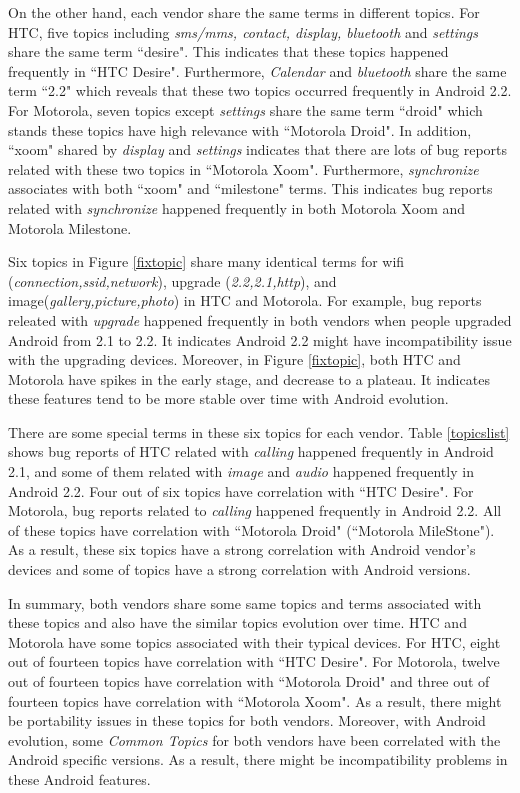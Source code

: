\documentclass[10pt, conference, compsocconf]{IEEEtran}
\begin{document}
On the other hand, each vendor share the same terms in different topics. For HTC, five topics including \textit{sms\//mms, contact, display, bluetooth} and \textit{settings} share the same term ``desire". This indicates that these topics happened frequently in ``HTC Desire". Furthermore, \textit{Calendar} and \textit{bluetooth} share the same term ``2.2" which reveals that these two topics occurred frequently in Android 2.2. For Motorola, seven topics except \textit{settings} share the same term ``droid" which stands these topics have high relevance with ``Motorola Droid". In addition, ``xoom" shared by \textit{display} and \textit{settings} indicates that there are lots of bug reports related with these two topics in ``Motorola Xoom". Furthermore, \textit{synchronize} associates with both ``xoom" and ``milestone" terms. This indicates bug reports related with \textit{synchronize} happened frequently in both Motorola Xoom and Motorola Milestone.

Six topics in Figure \ref{fixtopic} share many identical terms for wifi (\textit{connection,ssid,network}), upgrade (\textit{2.2,2.1,http}), and image(\textit{gallery,picture,photo}) in HTC and Motorola. For example, bug reports releated with \textit{upgrade} happened frequently in both vendors when people upgraded Android from 2.1 to 2.2. It indicates Android 2.2 might have incompatibility issue with the upgrading devices. Moreover, in Figure \ref{fixtopic}, both HTC and Motorola have spikes in the early stage, and decrease to a plateau. It indicates these features tend to be more stable over time with Android evolution.

There are some special terms in these six topics for each vendor. Table \ref{topicslist} shows bug reports of HTC related with \textit{calling} happened frequently in Android 2.1, and some of them related with \textit{image} and \textit{audio} happened frequently in Android 2.2. Four out of six topics have correlation with ``HTC Desire". For Motorola, bug reports related to \textit{calling} happened frequently in Android 2.2. All of these topics have correlation with ``Motorola Droid" (``Motorola MileStone"). As a result, these six topics have a strong correlation with Android vendor's devices and some of topics have a strong correlation with Android versions.

In summary, both vendors share some same topics and terms associated with these topics and also have the similar topics evolution over time. HTC and Motorola have some topics associated with their typical devices. For HTC, eight out of fourteen topics have correlation with ``HTC Desire". For Motorola, twelve out of fourteen topics have correlation with ``Motorola Droid" and three out of fourteen topics have correlation with ``Motorola Xoom". As a result, there might be portability issues in these topics for both vendors. Moreover, with Android evolution, some \textit{Common Topics} for both vendors have been correlated with the Android specific versions. As a result, there might be incompatibility problems in these Android features.
\end{document}

